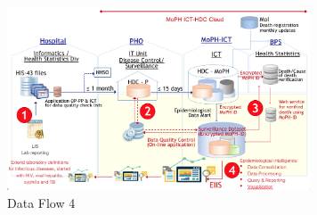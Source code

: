     \FloatBarrier
    \FloatBarrier
        \begin{figure}[h!]
            \centering
            	\includegraphics[width=9cm]{images/chapter-04/data_flow4.png}
            	\caption{Data Flow 4}
            	\label{fig_data_flow4}
        \end{figure}
    \FloatBarrier
    
